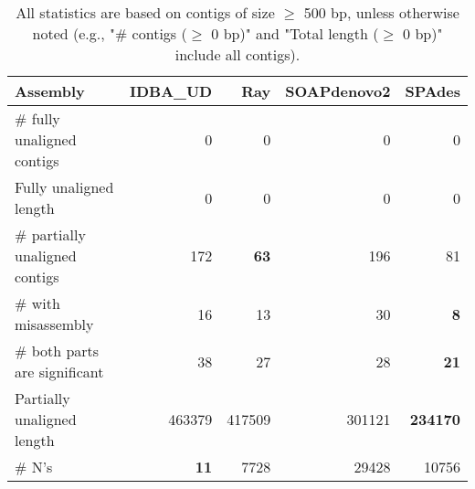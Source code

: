 \documentclass[12pt,a4paper]{article}
\begin{document}
\begin{table}[ht]
\begin{center}
\caption{All statistics are based on contigs of size $\geq$ 500 bp, unless otherwise noted (e.g., "\# contigs ($\geq$ 0 bp)" and "Total length ($\geq$ 0 bp)" include all contigs).}
\begin{tabular}{|l*{4}{|r}|}
\hline
Assembly & IDBA\_UD & Ray & SOAPdenovo2 & SPAdes \\ \hline
\# fully unaligned contigs & 0 & 0 & 0 & 0 \\ \hline
Fully unaligned length & 0 & 0 & 0 & 0 \\ \hline
\# partially unaligned contigs & 172 & {\bf 63} & 196 & 81 \\ \hline
\hspace{5mm}\# with misassembly & 16 & 13 & 30 & {\bf 8} \\ \hline
\hspace{5mm}\# both parts are significant & 38 & 27 & 28 & {\bf 21} \\ \hline
Partially unaligned length & 463379 & 417509 & 301121 & {\bf 234170} \\ \hline
\# N's & {\bf 11} & 7728 & 29428 & 10756 \\ \hline
\end{tabular}
\end{center}
\end{table}
\end{document}
